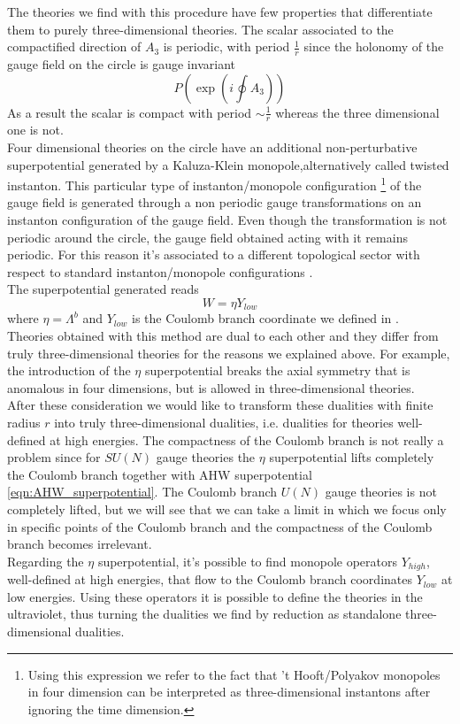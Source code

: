 The theories we find with this procedure have few properties that differentiate them to purely three-dimensional theories.
The scalar associated to the compactified direction of $A_3$ is periodic, with period $\frac{1}{r}$ since the holonomy of the gauge field on the circle is gauge invariant
\begin{equation}
 P\left( \exp{ \left( i \oint A_3 \right)}  \right) 
\end{equation}
As a result the scalar is compact with period $\sim \frac{1}{r}$ whereas the three dimensional one is not.\\
Four dimensional theories on the circle have an additional non-perturbative superpotential generated by a Kaluza-Klein monopole,alternatively called twisted instanton. 
This particular type of instanton/monopole configuration
\footnote{Using this expression we refer to the fact that 't Hooft/Polyakov monopoles in four dimension can be interpreted as three-dimensional instantons after ignoring the time dimension.}
of the gauge field is generated through a non periodic gauge transformations on an instanton configuration of the gauge field.
Even though the transformation is not periodic around the circle, the gauge field obtained acting with it remains periodic. 
For this reason it's associated to a different topological sector with respect to standard instanton/monopole configurations \cite{Davies:1999uw}. \\
The superpotential generated reads
\begin{equation}
W = \eta Y_{low}
\end{equation}
where $\eta = \Lambda^b$ and $Y_{low}$ is the Coulomb branch coordinate we defined in  .\\
Theories obtained with this method are dual to each other and they differ from truly three-dimensional theories for the reasons we explained above.
For example, the introduction of the $\eta$ superpotential breaks the axial symmetry that is anomalous in four dimensions, but is allowed in three-dimensional theories.\\
After these consideration we would like to transform these dualities with finite radius $r$ into truly three-dimensional dualities, i.e. dualities for theories well-defined at high energies.
The compactness of the Coulomb branch is not really a problem since for $SU(N)$ gauge theories the $\eta$ superpotential lifts completely the Coulomb branch together with AHW superpotential \eqref{eqn:AHW_superpotential}.
The Coulomb branch $ U(N)$ gauge theories is not completely lifted, but we will see that we can take a limit in which we focus only in specific points of the Coulomb branch and the compactness of the Coulomb branch becomes irrelevant.\\
Regarding the $\eta$ superpotential, it's possible to find monopole operators $Y_{high}$, well-defined at high energies, that flow to the Coulomb branch coordinates $Y_{low}$ at low energies. 
Using these operators it is possible to define the theories in the ultraviolet, thus turning the dualities we find by reduction as standalone three-dimensional dualities.


